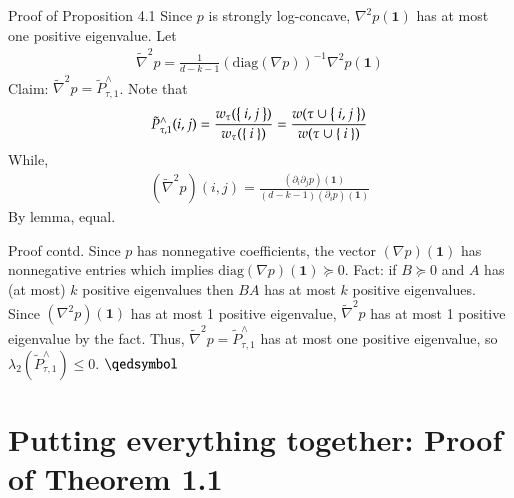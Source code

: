 \documentclass[10pt]{beamer}
\begin{document}
\begin{frame}{Proof of Proposition 4.1}
    Since $p$ is strongly log-concave, $\nabla^2 p(\mathbf 1)$ has at most one positive eigenvalue. Let
    \begin{align*}
        \tilde \nabla^2 p = \frac{1}{d-k-1} (\mathrm{diag}(\nabla p))^{-1} \nabla^2 p(\mathbf 1)
    \end{align*}
    Claim: $\tilde \nabla^2 p = \tilde P^\wedge_{\tau, 1}$. Note that 
    \begin{align*}
        \tilde P^\wedge_{\tau, 1}(i, j) = \frac{w_\tau(\Set{i, j})}{w_\tau(\Set{i})} = \frac{w(\tau \cup \Set{i, j})}{w(\tau \cup \Set{i})}
    \end{align*}
    While,
    \begin{align*}
        (\tilde \nabla^2 p)(i,j) = \frac{(\partial_i \partial_j p)(\mathbf 1)}{(d-k-1)(\partial_i p)(\mathbf 1)}
    \end{align*}
    By lemma, equal.
\end{frame}

\begin{frame}{Proof contd.}
    Since $p$ has nonnegative coefficients, the vector $(\nabla p)(\mathbf 1)$ has nonnegative entries which implies $\mathrm {diag}(\nabla p)(\mathbf 1) \succeq 0$. Fact: if $B \succeq 0$ and $A$ has (at most) $k$ positive eigenvalues then $BA$ has at most $k$ positive eigenvalues. Since $(\nabla^2 p)(\mathbf 1)$ has at most 1 positive eigenvalue, $\tilde \nabla^2 p$ has at most 1 positive eigenvalue by the fact. Thus, $\tilde \nabla^2 p = \tilde P^\wedge_{\tau, 1}$ has at most one positive eigenvalue, so $\lambda_2(\tilde P^\wedge_{\tau, 1}) \leq 0$. $\hfill \qedsymbol$
\end{frame}

\section{Putting everything together: Proof of Theorem 1.1}
\end{document}
